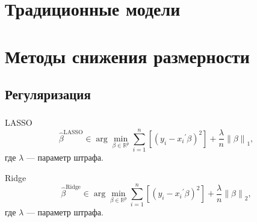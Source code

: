 \documentclass[c, dvipsnames]{beamer}  %
\begin{document}
\section{Традиционные модели}


\section{Методы снижения размерности}


\subsection{Регуляризация}



\begin{frame}
\frametitle{\insertsection} 
\framesubtitle{\insertsubsection}

 \begin{block}{LASSO}
  \begin{equation}
  \hat{\beta}^{\text{LASSO}} \in \arg \min_{\beta \in
\mathbb{R}^p} \sum_{i=1}^n \left[ (y_i - {x_i}^{'} \beta)^2 \right] +  \frac{\lambda}{n} \left\lVert \beta \right\rVert_1,
\end{equation}
где $\lambda$ --- параметр штрафа.
 \end{block}
  \begin{block}{Ridge}
  \begin{equation}
  \hat{\beta}^{\text{Ridge}} \in \arg \min_{\beta \in
\mathbb{R}^p} \sum_{i=1}^n \left[ (y_i - {x_i}^{'} \beta)^2 \right] +  \frac{\lambda}{n} \left\lVert \beta \right\rVert_2,
\end{equation}
где $\lambda$ --- параметр штрафа.
 \end{block}
 
  \end{frame}
\end{document}
